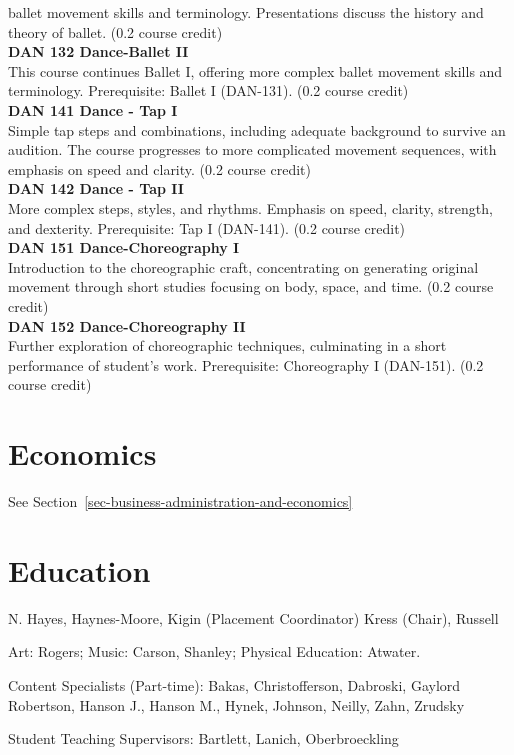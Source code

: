 \documentclass[
  letterpaper,
]{scrbook}
\begin{document}
ballet movement skills and terminology. Presentations discuss the
history and theory of ballet. (0.2 course credit)\\
\textbf{DAN 132 Dance-Ballet II}\\
This course continues Ballet I, offering more complex ballet movement
skills and terminology. Prerequisite: Ballet I (DAN-131). (0.2 course
credit)\\
\textbf{DAN 141 Dance - Tap I}\\
Simple tap steps and combinations, including adequate background to
survive an audition. The course progresses to more complicated movement
sequences, with emphasis on speed and clarity. (0.2 course credit)\\
\textbf{DAN 142 Dance - Tap II}\\
More complex steps, styles, and rhythms. Emphasis on speed, clarity,
strength, and dexterity. Prerequisite: Tap I (DAN-141). (0.2 course
credit)\\
\textbf{DAN 151 Dance-Choreography I}\\
Introduction to the choreographic craft, concentrating on generating
original movement through short studies focusing on body, space, and
time. (0.2 course credit)\\
\textbf{DAN 152 Dance-Choreography II}\\
Further exploration of choreographic techniques, culminating in a short
performance of student's work. Prerequisite: Choreography I (DAN-151).
(0.2 course credit)

\section{Economics}\label{sec-economics}

See Section~\ref{sec-business-administration-and-economics}

\section{Education}\label{sec-education}

N. Hayes, Haynes-Moore, Kigin (Placement Coordinator) Kress (Chair),
Russell

Art: Rogers; Music: Carson, Shanley; Physical Education: Atwater.

Content Specialists (Part-time): Bakas, Christofferson, Dabroski,
Gaylord Robertson, Hanson J., Hanson M., Hynek, Johnson, Neilly, Zahn,
Zrudsky

Student Teaching Supervisors: Bartlett, Lanich, Oberbroeckling
\end{document}
